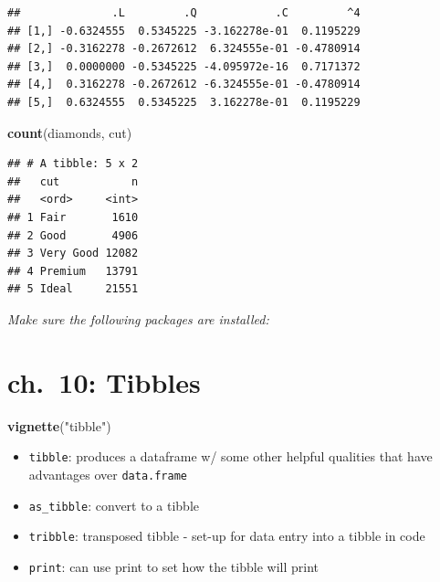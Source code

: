 \documentclass[]{book}
\newenvironment{Shaded}{\begin{snugshade}}{\end{snugshade}}
\newcommand{\DataTypeTok}[1]{\textcolor[rgb]{0.13,0.29,0.53}{#1}}
\newcommand{\DecValTok}[1]{\textcolor[rgb]{0.00,0.00,0.81}{#1}}
\newcommand{\KeywordTok}[1]{\textcolor[rgb]{0.13,0.29,0.53}{\textbf{#1}}}
\newcommand{\NormalTok}[1]{#1}
\newcommand{\OperatorTok}[1]{\textcolor[rgb]{0.81,0.36,0.00}{\textbf{#1}}}
\newcommand{\OtherTok}[1]{\textcolor[rgb]{0.56,0.35,0.01}{#1}}
\newcommand{\StringTok}[1]{\textcolor[rgb]{0.31,0.60,0.02}{#1}}
\providecommand{\tightlist}{%
  \setlength{\itemsep}{0pt}\setlength{\parskip}{0pt}}
\theoremstyle{definition}
\theoremstyle{definition}
\theoremstyle{definition}
\theoremstyle{remark}
\begin{document}
\begin{verbatim}
##              .L         .Q            .C         ^4
## [1,] -0.6324555  0.5345225 -3.162278e-01  0.1195229
## [2,] -0.3162278 -0.2672612  6.324555e-01 -0.4780914
## [3,]  0.0000000 -0.5345225 -4.095972e-16  0.7171372
## [4,]  0.3162278 -0.2672612 -6.324555e-01 -0.4780914
## [5,]  0.6324555  0.5345225  3.162278e-01  0.1195229
\end{verbatim}

\begin{Shaded}
\begin{Highlighting}[]
\KeywordTok{count}\NormalTok{(diamonds, cut)}
\end{Highlighting}
\end{Shaded}

\begin{verbatim}
## # A tibble: 5 x 2
##   cut           n
##   <ord>     <int>
## 1 Fair       1610
## 2 Good       4906
## 3 Very Good 12082
## 4 Premium   13791
## 5 Ideal     21551
\end{verbatim}

\emph{Make sure the following packages are installed:}

\hypertarget{ch.-10-tibbles}{%
\chapter{ch.~10: Tibbles}\label{ch.-10-tibbles}}

\begin{Shaded}
\begin{Highlighting}[]
\KeywordTok{vignette}\NormalTok{(}\StringTok{"tibble"}\NormalTok{)}
\end{Highlighting}
\end{Shaded}

\begin{itemize}
\tightlist
\item
  \texttt{tibble}: produces a dataframe w/ some other helpful qualities
  that have advantages over \texttt{data.frame}
\item
  \texttt{as\_tibble}: convert to a tibble
\item
  \texttt{tribble}: transposed tibble - set-up for data entry into a
  tibble in code
\item
  \texttt{print}: can use print to set how the tibble will print
\end{itemize}

\begin{Shaded}
\end{Shaded}
\end{document}
